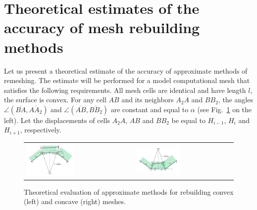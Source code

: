 \documentclass[
11pt,%
tightenlines,%
twoside,%
onecolumn,%
nofloats,%
nobibnotes,%
nofootinbib,%
superscriptaddress,%
noshowpacs,%
centertags]%
{revtex4}
\begin{document}

\section{Theoretical estimates of the accuracy of mesh rebuilding methods}

Let us present a theoretical estimate of the accuracy of approximate methods of remeshing.
The estimate will be performed for a model computational mesh that satisfies the following requirements.
All mesh cells are identical and have length $l$, the surface is convex.
For any cell $AB$ and its neighbors $A_2A$ and $BB_2$, the angles $\angle (\overline{BA}, \overline{AA_2})$ and $\angle (\overline{AB}, \overline{BB_2})$ are constant and equal to $\alpha$ (see Fig.~\ref{fig:text_1_remesh_2d_theoretical} on the left).
Let the displacements of cells $A_2A$, $AB$ and $BB_2$ be equal to $H_{i - 1}$, $H_i$ and $H_{i + 1}$, respectively.
\begin{figure}[ht]
\setcaptionmargin{5mm}
\onelinecaptionsfalse %
\begin{tabular}{ll}
\includegraphics[width=0.45\textwidth]{pics/theoretical.pdf}
&
\includegraphics[width=0.45\textwidth]{pics/theoretical_concave.pdf}
\end{tabular}
\caption{Theoretical evaluation of approximate methods for rebuilding convex (left) and concave (right) meshes.}
\label{fig:text_1_remesh_2d_theoretical}
\end{figure}
\end{document}
